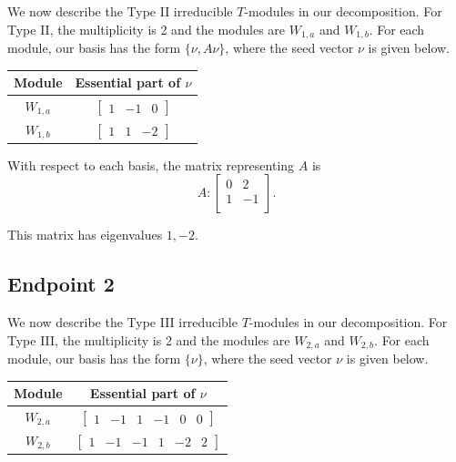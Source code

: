 \documentclass[12pt,letterpaper]{article}
\newcommand{\rowvector}[1]{\begin{bmatrix} #1 \end{bmatrix}}
\begin{document}
We now describe the Type II irreducible $T$-modules in our decomposition. For Type II, the multiplicity is 2 and the modules are $W_{1,a}$ and $W_{1,b}$. For each module, our basis has the form $\{\nu, A\nu\}$, where the seed vector $\nu$ is given below.
\begin{center}
    \begin{tabular}{c | c}
    \toprule
       \textbf{Module}  & \textbf {Essential part of }$\nu$ \\
       \midrule
       $W_{1,a}$  & $\rowvector{1 & -1 & 0}$ \\[1.67pt]
       $W_{1,b}$  & $\rowvector{1 & 1 & -2}$ \\
    \bottomrule
    \end{tabular}
\end{center}

With respect to each basis, the matrix representing $A$ is 
\begin{equation}
    A: \begin{bmatrix}
  0 & 2 \\
  1 & -1 \\
\end{bmatrix}.
\label{eq:pet-II}
\end{equation}

This matrix has eigenvalues $1, -2$.

\subsection{Endpoint 2}

We now describe the Type III irreducible $T$-modules in our decomposition. For Type III, the multiplicity is 2 and the modules are $W_{2,a}$ and $W_{2,b}$. For each module, our basis has the form $\{\nu\}$, where the seed vector $\nu$ is given below.
\begin{center}
    \begin{tabular}{c | c}
    \toprule
       \textbf{Module}  & \textbf {Essential part of }$\nu$ \\
       \midrule
       $W_{2,a}$  & $\rowvector{1&-1&1&-1&0&0}$ \\[1.67pt]
       $W_{2,b}$  & $\rowvector{1&-1&-1&1&-2&2}$ \\
    \bottomrule
    \end{tabular}
\end{center}
\end{document}
